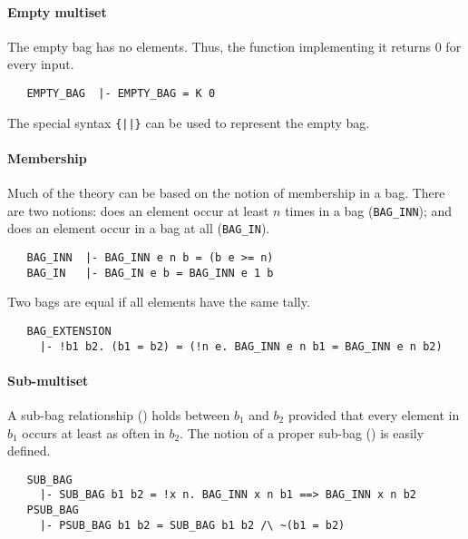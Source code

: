 \paragraph {Empty multiset}

The empty bag has no elements. Thus, the function implementing it
returns $0$ for every input.
%
\begin{hol}
\begin{verbatim}
   EMPTY_BAG  |- EMPTY_BAG = K 0
\end{verbatim}
\end{hol}

\noindent The special syntax {\verb+{||}+} can be used to represent the empty
bag.

\paragraph {Membership}

Much of the theory can be based on the notion of membership in a
bag. There are two notions: does an element occur at least $n$ times
in a bag ({\small\verb+BAG_INN+}); and does an element occur in a bag
at all ({\small\verb+BAG_IN+}).
%
\begin{hol}
\begin{verbatim}
   BAG_INN  |- BAG_INN e n b = (b e >= n)
   BAG_IN   |- BAG_IN e b = BAG_INN e 1 b
\end{verbatim}
\end{hol}
%
Two bags are equal if all elements have the same tally.
%
\begin{hol}
\begin{verbatim}
   BAG_EXTENSION
     |- !b1 b2. (b1 = b2) = (!n e. BAG_INN e n b1 = BAG_INN e n b2)
\end{verbatim}
\end{hol}

\paragraph{Sub-multiset}

A sub-bag relationship () holds between $b_1$ and
$b_2$ provided that every element in $b_1$ occurs at least as often in
$b_2$. The notion of a proper sub-bag () is easily
defined.
%
\begin{hol}
\begin{verbatim}
   SUB_BAG
     |- SUB_BAG b1 b2 = !x n. BAG_INN x n b1 ==> BAG_INN x n b2
   PSUB_BAG
     |- PSUB_BAG b1 b2 = SUB_BAG b1 b2 /\ ~(b1 = b2)
\end{verbatim}
\end{hol}


